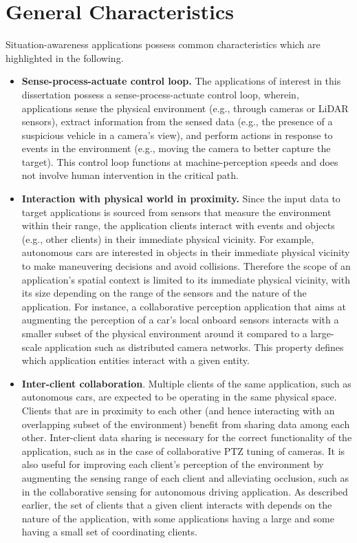 \section{General Characteristics}
\label{sec:app_characteristics}
Situation-awareness applications possess common characteristics which are highlighted in the following.
\begin{itemize}
\item \textbf{Sense-process-actuate control loop. }  The applications of interest in this dissertation possess a sense-process-actuate control loop, wherein, applications sense the physical environment (e.g., through cameras or LiDAR sensors), extract information from the sensed data (e.g., the presence of a suspicious vehicle in a camera's view), and perform actions in response to events in the environment (e.g., moving the camera to better capture the target). This control loop functions at machine-perception speeds and does not involve human intervention in the critical path.
\item \textbf{Interaction with physical world in proximity. } Since the input data to target applications is sourced from sensors that measure the environment within their range, the application clients interact with events and objects (e.g., other clients) in their immediate physical vicinity. For example, autonomous cars are interested in objects in their immediate physical vicinity to make maneuvering decisions and avoid collisions. Therefore the scope of an application's spatial context is limited to its immediate physical vicinity, with its size depending on the range of the sensors and the nature of the application. For instance, a collaborative perception application that aims at augmenting the perception of a car's local onboard sensors interacts with a smaller subset of the physical environment around it compared to a large-scale application such as distributed camera networks. This property defines which application entities interact with a given entity.
\item \textbf{Inter-client collaboration}. Multiple clients of the same application, such as autonomous cars, are expected to be operating in the same physical space. Clients that are in proximity to each other (and hence interacting with an overlapping subset of the environment) benefit from sharing data among each other. Inter-client data sharing is necessary for the correct functionality of the application, such as in the case of collaborative PTZ tuning of cameras. It is also useful for improving each client's perception of the environment by augmenting the sensing range of each client and alleviating occlusion, such as in the collaborative sensing for autonomous driving application. As described earlier, the set of clients that a given client interacts with depends on the nature of the application, with some applications having a large and some having a small set of coordinating clients.

\end{itemize}
